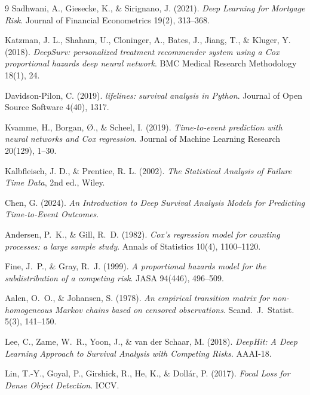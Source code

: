 \documentclass[11pt,a4paper]{article}
\begin{document}
\begin{thebibliography}{9}
  \small
  Sadhwani, A., Giesecke, K., \& Sirignano, J. (2021).
  \textit{Deep Learning for Mortgage Risk}. Journal of Financial Econometrics 19(2), 313--368.

  Katzman, J. L., Shaham, U., Cloninger, A., Bates, J., Jiang, T., \& Kluger, Y. (2018).
  \textit{DeepSurv: personalized treatment recommender system using a Cox proportional hazards deep neural network}. BMC Medical Research Methodology 18(1), 24.

  Davidson-Pilon, C. (2019).
  \textit{lifelines: survival analysis in Python}. Journal of Open Source Software 4(40), 1317.

  Kvamme, H., Borgan, {\O}., \& Scheel, I. (2019).
  \textit{Time-to-event prediction with neural networks and Cox regression}. Journal of Machine Learning Research 20(129), 1--30.

  Kalbfleisch, J. D., \& Prentice, R. L. (2002).
  \textit{The Statistical Analysis of Failure Time Data}, 2nd ed., Wiley.

  Chen, G. (2024).
  \textit{An Introduction to Deep Survival Analysis Models for Predicting Time-to-Event Outcomes}.

  Andersen, P.~K., \& Gill, R.~D. (1982).
  \textit{Cox's regression model for counting processes: a large sample study}. Annals of Statistics 10(4), 1100--1120.

  Fine, J.~P., \& Gray, R.~J. (1999).
  \textit{A proportional hazards model for the subdistribution of a competing risk}. JASA 94(446), 496--509.

  Aalen, O.~O., \& Johansen, S. (1978).
  \textit{An empirical transition matrix for non-homogeneous Markov chains based on censored observations}. Scand.\ J.\ Statist. 5(3), 141--150.

  Lee, C., Zame, W.~R., Yoon, J., \& van der Schaar, M. (2018).
  \textit{DeepHit: A Deep Learning Approach to Survival Analysis with Competing Risks}. AAAI-18.

  Lin, T.-Y., Goyal, P., Girshick, R., He, K., \& Doll{\'a}r, P. (2017).
  \textit{Focal Loss for Dense Object Detection}. ICCV.
\end{thebibliography}
\end{document}

